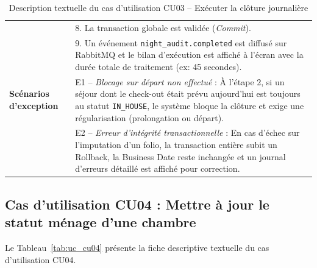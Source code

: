 \documentclass[12pt,a4paper,oneside]{report}
\begin{document}
\begin{table}[H]
\begin{tabularx}{\textwidth}{|p{3.5cm}|X|}
& 8. La transaction globale est validée (\textit{Commit}).\\
& 9. Un événement \texttt{night\_audit.completed} est diffusé sur RabbitMQ et le bilan d'exécution est affiché à l'écran avec la durée totale de traitement (ex: 45 secondes).\\
\hline
\textbf{Scénarios d'exception} & 
E1 -- \textit{Blocage sur départ non effectué} : À l'étape 2, si un séjour dont le check-out était prévu aujourd'hui est toujours au statut \texttt{IN\_HOUSE}, le système bloque la clôture et exige une régularisation (prolongation ou départ).\\
& E2 -- \textit{Erreur d'intégrité transactionnelle} : En cas d'échec sur l'imputation d'un folio, la transaction entière subit un Rollback, la Business Date reste inchangée et un journal d'erreurs détaillé est affiché pour correction.\\
\hline
\end{tabularx}
\caption{Description textuelle du cas d'utilisation CU03 -- Exécuter la clôture journalière}
\label{tab:uc_cu03}
\end{table}

\subsection{Cas d'utilisation CU04 : Mettre à jour le statut ménage d'une chambre}

Le Tableau~\ref{tab:uc_cu04} présente la fiche descriptive textuelle du cas d'utilisation CU04.
\end{document}
